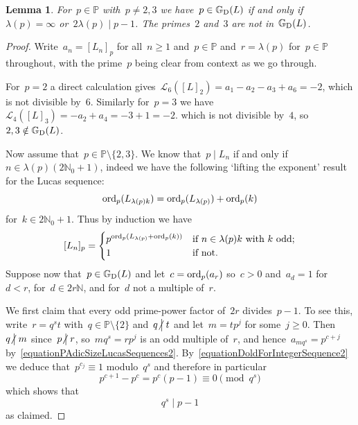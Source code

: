 \documentclass[]{interact}
\theoremstyle{plain}
\numberwithin{equation}{section} %
\newtheorem{lemma}[thm]{Lemma}
\numberwithin{table}{section} %
\numberwithin{figure}{section}
\def\NN{\mathbb{N}}
\def\PP{\mathbb{P}}
\def\gooddoldprimes{\mathbb{G}_{\rm{D}}}
\newcommand\ord{{\rm{ord}}}
\newcommand\least{{\mathcal{L}}}
\newcommand\notdivides{\mathrel{\kern-3pt\not\!\kern4.3pt\bigm|}}
\newcommand\divides\mid
\def\ge{\geqslant}
\begin{document}
\begin{lemma}\label{lemmaMainLucas}
For~$p\in\PP$ with~$p\neq2,3$ we have~$p\in\gooddoldprimes(L)$ if
and only if~$\lambda(p)=\infty$ or~$2\lambda(p)\divides p-1$.
The primes~$2$ and~$3$ are not in~$\gooddoldprimes(L)$.
\end{lemma}

\begin{proof}
Write~$a_n=[L_n]_p$ for all~$n\ge1$ and~$p\in\mathbb{P}$
and~$r=\lambda(p)$ for~$p\in\mathbb{P}$ throughout,
with the prime~$p$ being clear from context as we go through.

For~$p=2$ a direct calculation gives~$
\least_6([L]_2)=a_1-a_2-a_3+a_6=-2$,
which is not divisible by~$6$.
Similarly for~$p=3$ we have~$\least_4([L]_3)=-a_2+a_4=-3+1=-2$.
which is not divisible by~$4$, so~$2,3\notin\gooddoldprimes(L)$.

Now assume that~$p\in\mathbb{P}\setminus\{2,3\}$.
We know that~$p\divides L_n$ if and only if~$n\in\lambda(p)(2\NN_0+1)$,
indeed we have the following `lifting the exponent' result for
the Lucas sequence:
\begin{equation*}\label{equationPAdicSizeLucasSequences}
\ord_p(L_{\lambda(p)k})
=
\ord_p(L_{\lambda(p)})+\ord_p(k)
\end{equation*}
for~$k\in2\NN_0+1$.
Thus by induction we have
\begin{equation}\label{equationPAdicSizeLucasSequences2}
[L_n]_p
=
\begin{cases}
p^{\ord_p(L_{\lambda(p)}+\ord_p(k))}&\mbox{if }n\in\lambda(p)k\mbox{ with $k$ odd};\\
1&\mbox{if not.}
\end{cases}
\end{equation}
Suppose now that~$p\in\gooddoldprimes(L)$ and
let~$c=\ord_p(a_r)$ so~$c>0$ and~$a_d=1$
for~$d<r$, for~$d\in2r\mathbb{N}$, and for~$d$ not a multiple of~$r$.

We first claim that every odd prime-power factor of~$2r$
divides~$p-1$.
To see this, write~$r=q^st$ with~$q\in\mathbb{P}\setminus\{2\}$
and~$q\notdivides t$ and let~$m=tp^j$ for some~$j\ge0$.
Then~$q\notdivides m$ since~$p\notdivides r$,
so~$mq^s=rp^j$ is an odd multiple of~$r$,
and hence~$a_{mq^s}=p^{c+j}$ by~\eqref{equationPAdicSizeLucasSequences2}.
By~\eqref{equationDoldForIntegerSequence2} we deduce
that~$p^{c_j}\equiv1$ modulo~$q^s$ and therefore in particular
\[
p^{c+1}-p^c=p^c(p-1)\equiv0\pmod{q^s}
\]
which shows that
\begin{equation}\label{equationcleveroldSawian}
q^s\divides p-1
\end{equation}
as claimed.


\end{proof}
\end{document}
